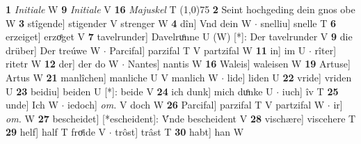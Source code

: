 \documentclass[8pt,a4paper,notitlepage]{article}
\begin{document}
\begin{table}[ht]
\begin{minipage}[t]{0.5\linewidth}
\textbf{1} \textit{Initiale} W  \textbf{9} \textit{Initiale} V  \textbf{16} \textit{Majuskel} T  \newline
\line(1,0){75} \newline
\textbf{2} Seint hochgeding dein gnos obe W \textbf{3} stîgende] stigender V strenger W \textbf{4} dîn] Vnd dein W  $\cdot$ snelliu] snelle T \textbf{6} erzeiget] erzoͤget V \textbf{7} tavelrunder] Davelruͦnne U (W) [*]: Der tavelrunder  V \textbf{9} die drüber] Der treúwe W  $\cdot$ Parcifal] parzifal T V partzifal W \textbf{11} in] im U  $\cdot$ rîter] ritetr W \textbf{12} der] der do W  $\cdot$ Nantes] nantis W \textbf{16} Waleis] waleisen W \textbf{19} Artuse] Artus W \textbf{21} manlîchen] manliche U V manlich W  $\cdot$ lide] liden U \textbf{22} vride] vriden U \textbf{23} beidiu] beiden U [*]: beide V \textbf{24} ich dunk] mich duͦnke U  $\cdot$ iuch] îv T \textbf{25} unde] Ich W  $\cdot$ iedoch] \textit{om.} V doch W \textbf{26} Parcifal] parzifal T V partzifal W  $\cdot$ ir] \textit{om.} W \textbf{27} bescheidet] [*escheident]: V́nde bescheident V \textbf{28} vischære] viscehere T \textbf{29} helf] half T froͤide V  $\cdot$ trôst] trâst T \textbf{30} habt] han W \newline
\end{minipage}
\end{table}
\end{document}
